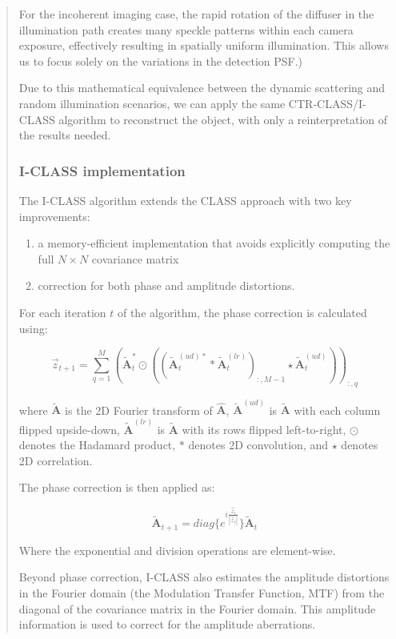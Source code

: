 \documentclass[12pt]{article}
\newenvironment{ourresponse}
    {\begin{tcolorbox}[width=\linewidth,breakable,enhanced,colback=gray!5,colframe=responsecolor!50,title=Response,left=5pt,right=5pt]}
    {\end{tcolorbox}}
\begin{document}
\begin{ourresponse}
\begin{quote}
For the incoherent imaging case, the rapid rotation of the diffuser in the illumination path creates many speckle patterns within each camera exposure, effectively resulting in spatially uniform illumination. This allows us to focus solely on the variations in the detection PSF.)

Due to this mathematical equivalence between the dynamic scattering and random illumination scenarios, we can apply the same CTR-CLASS/I-CLASS algorithm to reconstruct the object, with only a reinterpretation of the results needed.

\subsubsection*{I-CLASS implementation}

The I-CLASS algorithm extends the CLASS approach with two key improvements:
\begin{enumerate}
    \item a memory-efficient implementation that avoids explicitly computing the full $N \times N$ covariance matrix
    \item correction for both phase and amplitude distortions.
\end{enumerate}
For each iteration $t$ of the algorithm, the phase correction is calculated using:

\begin{equation}
\vec{z}_{t+1} = \sum_{q=1}^{M} (\tilde{\mathbf{A}}_t^* \odot ((\tilde{\mathbf{A}}_t^{(ud)*} * \tilde{\mathbf{A}}_t^{(lr)})_{:,M-1} \star \tilde{\mathbf{A}}_t^{(ud)}))_{:,q}
\end{equation}

where $\tilde{\mathbf{A}}$ is the 2D Fourier transform of $\hat{\mathbf{A}}$, $\tilde{\mathbf{A}}^{(ud)}$ is $\tilde{\mathbf{A}}$ with each column flipped upside-down, $\tilde{\mathbf{A}}^{(lr)}$ is $\tilde{\mathbf{A}}$ with its rows flipped left-to-right, $\odot$ denotes the Hadamard product, $*$ denotes 2D convolution, and $\star$ denotes 2D correlation.

The phase correction is then applied as:

\begin{equation}
\tilde{\mathbf{A}}_{t+1} = diag\{e^{i\frac{\vec{z}_t}{|\vec{z}_t|}}\} \tilde{\mathbf{A}}_t
\end{equation}

Where the exponential and division operations are element-wise.

Beyond phase correction, I-CLASS also estimates the amplitude distortions in the Fourier domain (the Modulation Transfer Function, MTF) from the diagonal of the covariance matrix in the Fourier domain. This amplitude information is used to correct for the amplitude aberrations.


\end{quote}
\end{ourresponse}
\end{document}
